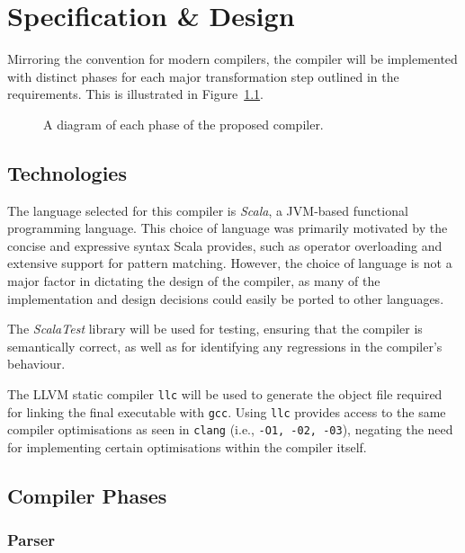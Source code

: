 \chapter{Specification \& Design}
\label{ch:design}

Mirroring the convention for modern compilers, the compiler will be implemented with distinct phases
for each major transformation step outlined in the requirements. This is illustrated in
Figure~\ref{fig:project-compiler-spec}.

\begin{figure}
      \centering
      
      \caption{A diagram of each phase of the proposed compiler.}
      \label{fig:project-compiler-spec}
\end{figure}

\section{Technologies}

The language selected for this compiler is \emph{Scala}, a JVM-based functional programming
language. This choice of language was primarily motivated by the concise and expressive syntax Scala
provides, such as operator overloading and extensive support for pattern matching. However, the
choice of language is not a major factor in dictating the design of the compiler, as many of the
implementation and design decisions could easily be ported to other languages.

The \emph{ScalaTest} library will be used for testing, ensuring that the compiler is semantically
correct, as well as for identifying any regressions in the compiler's behaviour.

The LLVM static compiler \texttt{llc} will be used to generate the object file required for linking
the final executable with \texttt{gcc}. Using \texttt{llc} provides access to the same compiler
optimisations as seen in \texttt{clang} (i.e., \texttt{-O1, -02, -03}), negating the need for
implementing certain optimisations within the compiler itself.

\section{Compiler Phases}

\subsection{Parser}

